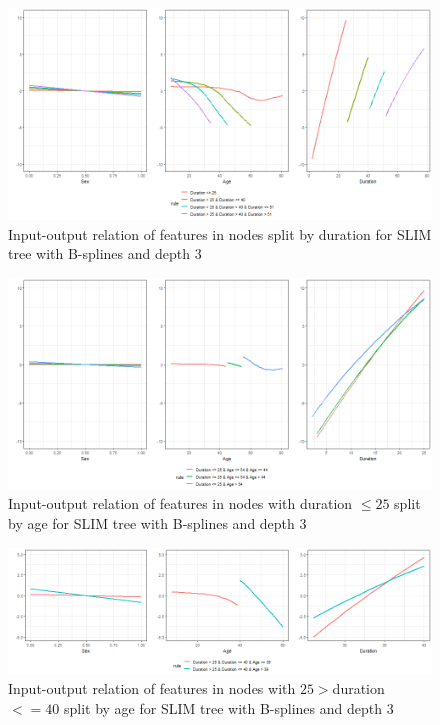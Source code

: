 \begin{figure}[!htb]
    \centering
    \includegraphics[width = 16cm]{Figures/insurance_use_case/k2204_PPV/effects_duration.png}
    \caption{Input-output relation of features in nodes split by duration for SLIM tree with B-splines and depth 3}
    \label{fig:ins_k2204_ppv_effects_duration}
\end{figure}




\begin{figure}[!htb]
    \centering    
    \includegraphics[width = 16cm]{Figures/insurance_use_case/k2204_PPV/effects_age_low_duration.png}
    \caption{Input-output relation of features in nodes with duration $\leq 25$ split by age for SLIM tree with B-splines and depth 3}
    \label{fig:ins_k2204_ppv_effects_age_low_duration}
\end{figure}

\begin{figure}[!htb]
    \centering    
    \includegraphics[width = 16cm]{Figures/insurance_use_case/k2204_PPV/effects_age_medium_duration.png}
    \caption{Input-output relation of features in nodes with $25 > $duration $<= 40$ split by age for SLIM tree with B-splines and depth 3}
    \label{fig:ins_k2204_ppv_effects_age_medium_duration}
\end{figure}


